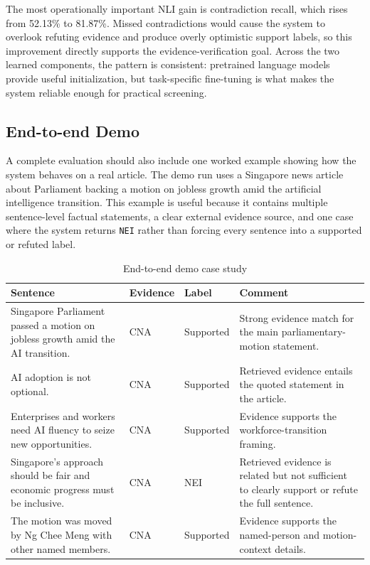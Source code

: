 \documentclass[11pt]{article}
\newcommand{\code}[1]{\texttt{#1}}
\begin{document}
The most operationally important NLI gain is contradiction recall, which rises
from 52.13\% to 81.87\%. Missed contradictions would cause the system to
overlook refuting evidence and produce overly optimistic support labels, so this
improvement directly supports the evidence-verification goal. Across the two
learned components, the pattern is consistent: pretrained language models
provide useful initialization, but task-specific fine-tuning is what makes the
system reliable enough for practical screening.

\FloatBarrier

\subsection{End-to-end Demo}

A complete evaluation should also include one worked example showing how the
system behaves on a real article. The demo run uses a Singapore news article
about Parliament backing a motion on jobless growth amid the artificial
intelligence transition. This example is useful because it contains multiple
sentence-level factual statements, a clear external evidence source, and one
case where the system returns \code{NEI} rather than forcing every sentence into
a supported or refuted label.

\begin{table}[H]
    \centering
    \caption{End-to-end demo case study}
    \label{tab:case-study}
    \small
    \begin{tabularx}{\textwidth}{@{}p{}p{}p{}Y@{}}
        \toprule
        \textbf{Sentence} & \textbf{Evidence} & \textbf{Label} & \textbf{Comment} \\
        \midrule
        Singapore Parliament passed a motion on jobless growth amid the AI transition. & CNA & Supported & Strong evidence match for the main parliamentary-motion statement. \\
        AI adoption is not optional. & CNA & Supported & Retrieved evidence entails the quoted statement in the article. \\
        Enterprises and workers need AI fluency to seize new opportunities. & CNA & Supported & Evidence supports the workforce-transition framing. \\
        Singapore's approach should be fair and economic progress must be inclusive. & CNA & NEI & Retrieved evidence is related but not sufficient to clearly support or refute the full sentence. \\
        The motion was moved by Ng Chee Meng with other named members. & CNA & Supported & Evidence supports the named-person and motion-context details. \\
        \bottomrule
    \end{tabularx}
\end{table}
\end{document}
